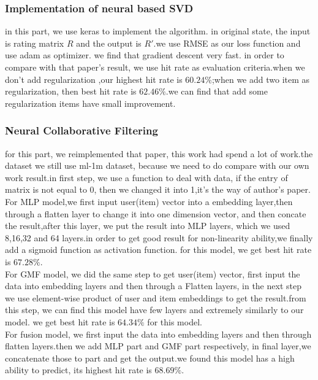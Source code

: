 \documentclass{acmtog} %
\begin{document}
\subsubsection{Implementation of neural based SVD}
in this part, we use keras to implement the algorithm. in original state, the input is rating matrix $R$ and the output is $R'$.we use RMSE as our loss function and use adam as optimizer. we find that gradient descent very fast. in order to compare with that paper's result, we use hit rate as evaluation criteria.when we don't add regularization ,our highest hit rate is $60.24\%$;when we add two item as regularization, then best hit rate is $62.46\%$.we can find that add some regularization items have small improvement.
\subsubsection{Neural Collaborative Filtering}
for this part, we reimplemented that paper, this work had spend a lot of work.the dataset we still use ml-1m dataset, because we need to do compare with our own work result.in first step, we use a function to deal with data, if the entry of matrix is not equal to 0, then we changed it into 1,it's the way of author's paper.\\ For MLP model,we first input user(item) vector into a embedding layer,then through a flatten layer to change it into one dimension vector, and then concate the result,after this layer, we put the result into  MLP layers, which we used 8,16,32 and 64 layers.in order to get good result for non-linearity ability,we finally add a sigmoid function as activation function. for this model, we get best hit rate is $67.28\%$.\\

For GMF model, we did the same step to get user(item) vector, first input the data into embedding layers and then through a Flatten layers, in the next step we use element-wise product of user and item embeddings to get the result.from this step, we can find this model have few layers and extremely similarly to our model. we get best hit rate is $64.34\%$ for this model.\\

For fusion model, we first input the data into embedding layers and then through flatten layers.then we add MLP part and GMF part respectively, in final layer,we concatenate those to part and get the output.we found this model has a high ability to predict, its highest hit rate is  $68.69\%$.\\
\end{document}
